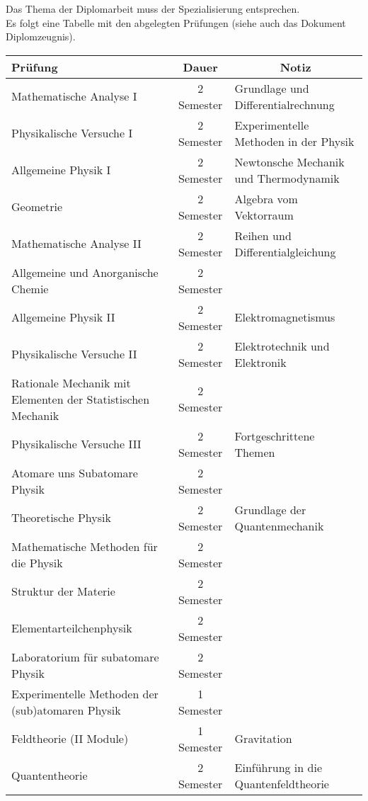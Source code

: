 \documentclass[a4paper,11pt]{article}
\begin{document}
Das Thema der Diplomarbeit muss der Spezialisierung entsprechen.\\

Es folgt eine Tabelle mit den abgelegten Pr\"ufungen (siehe auch das Dokument
Diplomzeugnis).

\newpage

\begin{table}[hbt]
\centering
\begin{tabular}{p{5cm}cl}
\toprule
\textbf{Pr\"ufung} & \textbf{Dauer}                      &
\multicolumn{1}{c}{\textbf{Notiz}}
\\
\midrule
Mathematische Analyse I  & 2 Semester & Grundlage und
Differentialrechnung \\
Physikalische Versuche I & 2 Semester            & Experimentelle
Methoden in der Physik\\
Allgemeine Physik I     &  2 Semester           &   Newtonsche
Mechanik und Thermodynamik        \\
Geometrie       & 2 Semester           &   Algebra vom
Vektorraum \\
\midrule
Mathematische Analyse II  & 2 Semester & Reihen und Differentialgleichung \\
Allgemeine und Anorganische Chemie & 2 Semester & \\
Allgemeine Physik II & 2 Semester &  Elektromagnetismus\\
Physikalische Versuche II & 2 Semester & Elektrotechnik und Elektronik \\
Rationale Mechanik mit Elementen der Statistischen Mechanik & 2 Semester & \\
\midrule
Physikalische Versuche III & 2 Semester & Fortgeschrittene Themen\\
Atomare uns Subatomare Physik & 2 Semester & \\
Theoretische Physik & 2 Semester & Grundlage der Quantenmechanik\\
Mathematische Methoden f\"ur die Physik & 2 Semester &\\
Struktur der Materie & 2 Semester &\\
\midrule
Elementarteilchenphysik & 2 Semester & \\
Laboratorium f\"ur subatomare Physik & 2 Semester &\\
Experimentelle Methoden der (sub)atomaren Physik & 1 Semester & \\
Feldtheorie (II Module) & 1 Semester & Gravitation\\
Quantentheorie & 2 Semester & Einf\"uhrung in die Quantenfeldtheorie\\
\bottomrule
\end{tabular}
\end{table}
\end{document}
